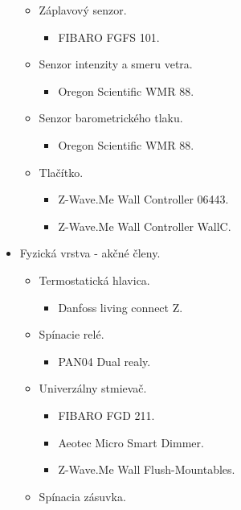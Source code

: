 \begin{itemize}
\begin{itemize}
    \item Záplavový senzor.    
      \begin{itemize}
        \item FIBARO FGFS 101.        
       \end{itemize}                
    \item Senzor intenzity a smeru vetra.    
      \begin{itemize}      
        \item Oregon Scientific WMR 88. 
       \end{itemize}         
    \item Senzor barometrického tlaku.        
      \begin{itemize}      
        \item Oregon Scientific WMR 88. 
       \end{itemize}             
    \item Tlačítko.     
      \begin{itemize}      
        \item Z-Wave.Me Wall Controller 06443. 
        \item Z-Wave.Me Wall Controller WallC.
       \end{itemize}             
  \end{itemize}
\item Fyzická vrstva - akčné členy.
  \begin{itemize}
    \item Termostatická hlavica.
      \begin{itemize}      
        \item Danfoss living connect Z. 
       \end{itemize}     
    \item Spínacie relé.
      \begin{itemize}      
        \item PAN04 Dual realy.         
       \end{itemize}     
    \item Univerzálny stmievač.    
      \begin{itemize}      
        \item FIBARO FGD 211.         
        \item Aeotec Micro Smart Dimmer. 
        \item Z-Wave.Me Wall Flush-Mountables.                 
       \end{itemize}         
    \item Spínacia zásuvka.     
      \begin{itemize}      

\end{itemize}
\end{itemize}
\end{itemize}

